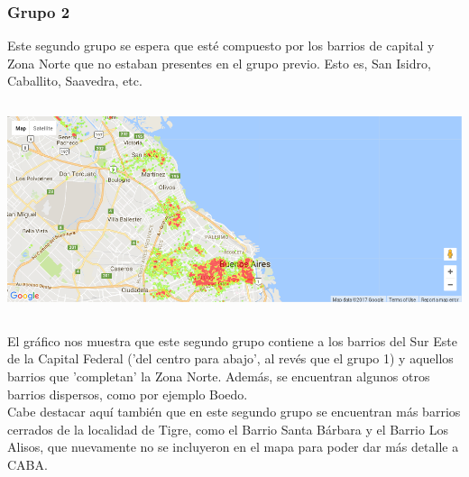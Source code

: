 \documentclass[a4paper, 10pt]{article}
\newcommand\tab[1][0.5cm]{\hspace*{#1}}
\begin{document}
				\subsubsection{Grupo 2}
					Este segundo grupo se espera que esté compuesto por los barrios de capital y Zona Norte que no estaban presentes
					en el grupo previo. Esto es, San Isidro, Caballito, Saavedra, etc.
					\begin{center}
						\includegraphics[width=6in, height=2.46in]{images/m2Group2HeatMap}
				  	\end{center}
				  	\tab El gráfico nos muestra que este segundo grupo contiene a los barrios del Sur Este de la Capital Federal
				  	('del centro para abajo', al revés que el grupo 1) y aquellos barrios que 'completan' la Zona Norte. Además, se
				  	encuentran algunos otros barrios dispersos, como por ejemplo Boedo. \\
				  	\tab Cabe destacar aquí también que en este segundo grupo se encuentran más barrios cerrados de la localidad de
				  	Tigre, como el Barrio Santa Bárbara y el Barrio Los Alisos, que nuevamente no se incluyeron en el mapa para
				  	poder dar más detalle a CABA.
\end{document}
